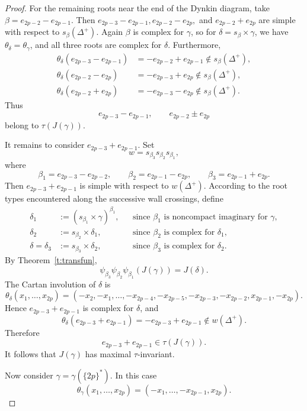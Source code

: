 \documentclass{amsart}
\theoremstyle{definition}
\begin{document}
\begin{proof}
For the remaining roots near the end of the Dynkin diagram, take
$\beta=e_{2p-2}-e_{2p-1}.$
Then
$e_{2p-3}-e_{2p-1},
e_{2p-2}-e_{2p},$
and 
$e_{2p-2}+e_{2p}$
are simple with respect to \(s_\beta(\Delta^+)\).
Again \(\beta\) is complex for \(\gamma\), so for
$\delta=s_\beta\times\gamma$, we have \(\theta_\delta=\theta_\gamma\), and all three roots are
complex for \(\delta\). Furthermore,
\begin{align*}
\theta_\delta(e_{2p-3}-e_{2p-1})
&=-e_{2p-2}+e_{2p-1}
  \notin s_\beta(\Delta^+),\\
\theta_\delta(e_{2p-2}-e_{2p})
&=-e_{2p-3}+e_{2p}
  \notin s_\beta(\Delta^+),\\
\theta_\delta(e_{2p-2}+e_{2p})
&=-e_{2p-3}-e_{2p}
  \notin s_\beta(\Delta^+).
\end{align*}
Thus
\[
e_{2p-3}-e_{2p-1},
\qquad
e_{2p-2}\pm e_{2p}
\]
belong to \(\tau(J(\gamma))\).

It remains to consider \(e_{2p-3}+e_{2p-1}\). Set
\[
w=s_{\beta_3}s_{\beta_2}s_{\beta_1},
\]
where
\[
\beta_1=e_{2p-3}-e_{2p-2},
\qquad
\beta_2=e_{2p-1}-e_{2p},
\qquad
\beta_3=e_{2p-1}+e_{2p}.
\]
Then \(e_{2p-3}+e_{2p-1}\) is simple with respect to
\(w(\Delta^+)\). According to the root types encountered along the
successive wall crossings, define
\begin{align*}
\delta_1
&:=(s_{\beta_1}\times\gamma)^{\beta_1},
&&\text{since \(\beta_1\) is noncompact imaginary for \(\gamma\)},\\
\delta_2
&:=s_{\beta_2}\times\delta_1,
&&\text{since \(\beta_2\) is complex for \(\delta_1\)},\\
\delta=\delta_3
&:=s_{\beta_3}\times\delta_2,
&&\text{since \(\beta_3\) is complex for \(\delta_2\)}.
\end{align*}
By Theorem~\ref{t:transfun},
\[
\psi_{\beta_3}\psi_{\beta_2}\psi_{\beta_1}(J(\gamma))
=
J(\delta).
\]
The Cartan involution of \(\delta\) is
\[
\theta_\delta(x_1,\ldots,x_{2p})
=
(-x_2,-x_1,\ldots,
-x_{2p-4},-x_{2p-5},
-x_{2p-3},-x_{2p-2},
x_{2p-1},-x_{2p}).
\]
Hence \(e_{2p-3}+e_{2p-1}\) is complex for \(\delta\), and
\[
\theta_\delta(e_{2p-3}+e_{2p-1})
=
-e_{2p-3}+e_{2p-1}
\notin w(\Delta^+).
\]
Therefore
\[
e_{2p-3}+e_{2p-1}\in\tau(J(\gamma)).
\]
It follows that \(J(\gamma)\) has maximal \(\tau\)-invariant.

Now consider
$\gamma=\gamma(\{2p\}^*).$
In this case
\[
\theta_\gamma(x_1,\ldots,x_{2p})
=
(-x_1,\ldots,-x_{2p-1},x_{2p}).
\]


\end{proof}
\end{document}

